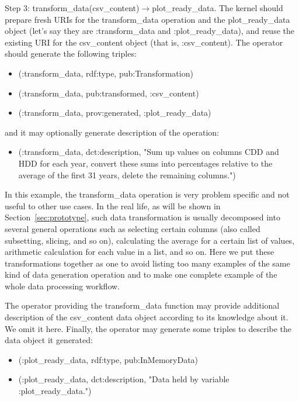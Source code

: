 Step 3: transform\_data(csv\_content)$\rightarrow$plot\_ready\_data. The kernel should prepare fresh URIs for the transform\_data operation and the plot\_ready\_data object (let's say they are :transform\_data and :plot\_ready\_data), and reuse the existing URI for the csv\_content object (that is, :csv\_content). The operator should generate the following triples:
\begin{itemize}
	\item (:transform\_data, rdf:type, pub:Transformation)
	\item (:transform\_data, pub:transformed, :csv\_content)
	\item (:transform\_data, prov:generated, :plot\_ready\_data)
\end{itemize}
and it may optionally generate description of the operation:
\begin{itemize}
	\item (:transform\_data, dct:description, "Sum up values on columns CDD and HDD for each year, convert these sums into percentages relative to the average of the first 31 years, delete the remaining columns.")
\end{itemize}
In this example, the transform\_data operation is very problem specific and not useful to other use cases. In the real life, as will be shown in Section~\ref{sec:prototype}, such data transformation is usually decomposed into several general operations such as selecting certain columns (also called subsetting, slicing, and so on), calculating the average for a certain list of values, arithmetic calculation for each value in a list, and so on. Here we put these transformations together as one to avoid listing too many examples of the same kind of data generation operation and to make one complete example of the whole data processing workflow.

The operator providing the transform\_data function may provide additional description of the csv\_content data object according to its knowledge about it. We omit it here. Finally, the operator may generate some triples to describe the data object it generated:
\begin{itemize}
	\item (:plot\_ready\_data, rdf:type, pub:InMemoryData)
	\item (:plot\_ready\_data, dct:description, "Data held by variable :plot\_ready\_data.")
\end{itemize}

